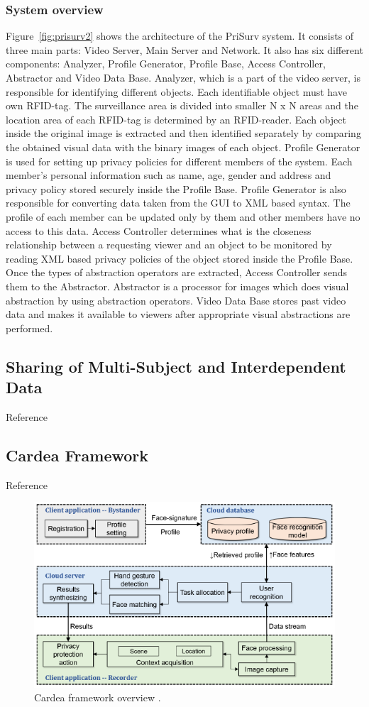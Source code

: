 \documentclass[conference]{IEEEtran}
\begin{document}
\subsubsection{System overview}
Figure~\ref{fig:prisurv2} shows the architecture of the PriSurv system. It consists of three main parts: Video Server, Main Server and Network. It also has six different components: Analyzer, Profile Generator, Profile Base, Access Controller, Abstractor and Video Data Base. Analyzer, which is a part of the video server, is responsible for identifying different objects. Each identifiable object must have own \ac{RFID}-tag. The surveillance area is divided into smaller N x N areas and the location area of each \ac{RFID}-tag is determined by an \ac{RFID}-reader. Each object inside the original image is extracted and then identified separately by comparing the obtained visual data with the binary images of each object. Profile Generator is used for setting up privacy policies for different members of the system. Each member's personal information such as name, age, gender and address and privacy policy stored securely inside the Profile Base. Profile Generator is also responsible for converting data taken from the GUI to \ac{XML} based syntax. The profile of each member can be updated only by them and other members have no access to this data. Access Controller determines what is the closeness relationship between a requesting viewer and an object to be monitored by reading \ac{XML} based privacy policies of the object stored inside the Profile Base. Once the types of abstraction operators are extracted, Access Controller sends them to the Abstractor. Abstractor is a processor for images which does visual abstraction by using abstraction operators. Video Data Base stores past video data and makes it available to viewers after appropriate visual abstractions are performed. 



\subsection{Sharing of Multi-Subject and Interdependent Data}
Reference \cite{olteanu2018consensual}

\subsection{Cardea Framework}
Reference \cite{shu2016cardea}

\begin{figure}[t]
\centerline{\includegraphics[width=.5\textwidth]{img/cardea_overview_diagram.png}}
\caption{Cardea framework overview \cite{shu2016cardea}.}
\label{fig:cardea}
\end{figure}
\end{document}
